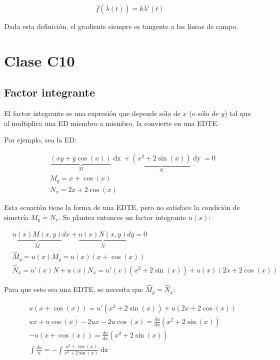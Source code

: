 \documentclass{article}
\begin{document}
\begin{equation}
\overline{f}(\overline{\lambda}(t)) = k \overline{\lambda}'(t)
\end{equation}

Dada esta definición, el gradiente siempre es tangente a las líneas de campo.

\section{Clase C10}

\subsection{Factor integrante}

El factor integrante es una expresión que depende sólo de $x$ (o sólo de $y$) tal que al multiplica una ED miembro a miembro, la convierte en una EDTE.

Por ejemplo, sea la ED:

\begin{align}
& \underbrace{ (xy + y \cos(x)) }_{M} \mathop{dx} + \underbrace{ (x^2 + 2 \sin(x)) }_N \mathop{dy} = 0 \\
& M_y = x + \cos(x) \\
& N_x = 2x + 2 \cos(x)
\end{align}

Esta ecuación tiene la forma de una EDTE, pero no satisface la condición de simetría $M_y = N_x$. Se plantea entonces un factor integrante $u(x)$:

\begin{align}
& \underbrace{ u(x) M(x,y) }_{\hat{M}} dx + \underbrace{ u(x) N(x,y) }_{\hat{N}} dy = 0 \\ 
& \hat{M}_y = u(x) M_y = u(x) (x + \cos(x)) \\
& \hat{N}_x = u'(x) N + u(x) N_x = u'(x) (x^2 + 2 \sin(x)) + u(x) (2x + 2 \cos(x))  
\end{align}

Para que esto sea una EDTE, se necesita que $\hat{M}_y = \hat{N}_x$:

\begin{align}
& u (x + \cos(x)) = u' (x^2 + 2 \sin(x)) + u (2x + 2 \cos(x)) \\
& u x + u \cos(x) - 2 u x -2 u \cos(x) = \frac{du}{dx} \left( x^2 + 2 \sin(x) \right) \\
& -u (x + \cos(x)) = \frac{du}{dx} \left( x^2 + 2 \sin(x) \right) \\
& \int \frac{du}{u} = -\int \frac{x^2 + \cos(x)}{x^2 + 2 \sin(x)} \mathop{dx}
\end{align}
\end{document}
